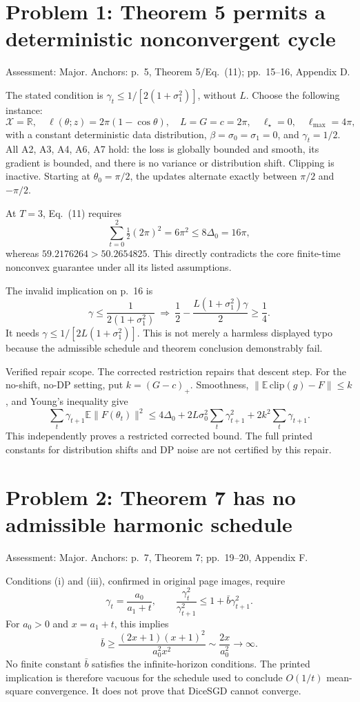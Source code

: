 \documentclass[10pt]{article}
\begin{document}
\section*{Problem 1: Theorem 5 permits a deterministic nonconvergent cycle}
Assessment: Major. Anchors: p. 5, Theorem 5/Eq. (11); pp. 15–16, Appendix D.\par
The stated condition is \(\gamma_t\le1/[2(1+\sigma_1^2)]\), without \(L\). Choose the following instance: \[\mathcal X=\mathbb R,\quad \ell(\theta;z)=2\pi(1-\cos\theta),\quad
 L=G=c=2\pi,\quad \ell_\star=0,\quad\ell_{\max}=4\pi,\] with a constant deterministic data distribution, \(\beta=\sigma_0=\sigma_1=0\), and \(\gamma_t=1/2\). All A2, A3, A4, A6, A7 hold: the loss is globally bounded and smooth, its gradient is bounded, and there is no variance or distribution shift. Clipping is inactive. Starting at \(\theta_0=\pi/2\), the updates alternate exactly between \(\pi/2\) and \(-\pi/2\).\par
At \(T=3\), Eq. (11) requires \[\sum_{t=0}^{2}\tfrac12(2\pi)^2=6\pi^2
 \le 8\Delta_0=16\pi,\] whereas \(59.2176264>50.2654825\). This directly contradicts the core finite-time nonconvex guarantee under all its listed assumptions.\par
The invalid implication on p. 16 is \[\gamma\le\frac1{2(1+\sigma_1^2)}
 \ \Longrightarrow\
 \frac12-\frac{L(1+\sigma_1^2)\gamma}{2}\ge\frac14.\] It needs \(\gamma\le1/[2L(1+\sigma_1^2)]\). This is not merely a harmless displayed typo because the admissible schedule and theorem conclusion demonstrably fail.\par
Verified repair scope. The corrected restriction repairs that descent step. For the no-shift, no-DP setting, put \(k=(G-c)_+\). Smoothness, \(\|\mathbb E\,\mathrm{clip}(g)-F\|\le k\), and Young’s inequality give \[\sum_t\gamma_{t+1}\mathbb E\|F(\theta_t)\|^2
 \le4\Delta_0+2L\sigma_0^2\sum_t\gamma_{t+1}^2
       +2k^2\sum_t\gamma_{t+1}.\] This independently proves a restricted corrected bound. The full printed constants for distribution shifts and DP noise are not certified by this repair.\par
\section*{Problem 2: Theorem 7 has no admissible harmonic schedule}
Assessment: Major. Anchors: p. 7, Theorem 7; pp. 19–20, Appendix F.\par
Conditions (i) and (iii), confirmed in original page images, require \[\gamma_t=\frac{a_0}{a_1+t},\qquad
 \frac{\gamma_t^2}{\gamma_{t+1}^2}\le1+\bar b\gamma_{t+1}^2.\] For \(a_0>0\) and \(x=a_1+t\), this implies \[\bar b\ge\frac{(2x+1)(x+1)^2}{a_0^2x^2}
 \sim \frac{2x}{a_0^2}\longrightarrow\infty.\] No finite constant \(\bar b\) satisfies the infinite-horizon conditions. The printed implication is therefore vacuous for the schedule used to conclude \(O(1/t)\) mean-square convergence. It does not prove that DiceSGD cannot converge.\par
\end{document}
